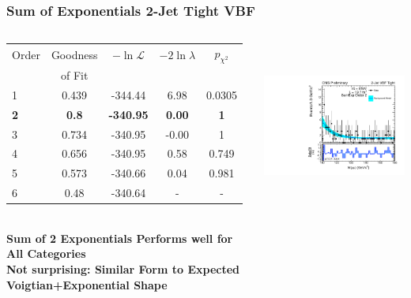 \documentclass{beamer}
\begin{document}
\begin{frame}
\frametitle{Sum of Exponentials 2-Jet Tight VBF}
  \begin{columns}[c]
   \column{60mm}
      \begin{center}
      \tiny
\begin{tabular}{|l|c|c|c|c|} \hline
Order & Goodness & $-\ln\mathcal{L}$ & $-2\ln\lambda$ & $p_{\chi^2}$ \\ 
 & of Fit  &  & &  \\ \hline \hline
1 & 0.439 & -344.44 & 6.98 & 0.0305  \\ \hline
\bf 2 & \bf 0.8 & \bf -340.95 & \bf 0.00 & \bf 1  \\ \hline
3 & 0.734 & -340.95 & -0.00 & 1  \\ \hline
4 & 0.656 & -340.95 & 0.58 & 0.749  \\ \hline
5 & 0.573 & -340.66 & 0.04 & 0.981  \\ \hline
6 & 0.48 & -340.64 & - & -  \\ \hline
\end{tabular}
\\
\normalsize
\vspace{2em}
\bf
Sum of 2 Exponentials Performs well for All Categories
\\
\vspace{1em}
Not surprising: Similar Form to Expected Voigtian+Exponential Shape
      \end{center}
   \column{60mm}
      \begin{center}
        \includegraphics[height=55mm]{wholeRangeHggStudy1/plotsOrderStudyExpPow/order_Shape_Jet2CutsVBFPass_SumExp2}
      \end{center}
  \end{columns}
  \begin{center}
  \end{center}
\end{frame}
\end{document}
